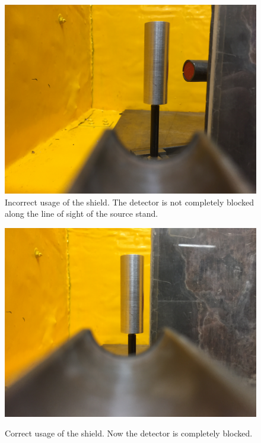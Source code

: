 \documentclass{../lab}
\begin{document}
\begin{enumerate}
\begin{figure}[H]
\begin{minipage}{.49\linewidth}
    \centering
    \href{http://experimentationlab.berkeley.edu/sites/default/files/upimages/Detector-Exposed.JPG}{\includegraphics[width=\linewidth,keepaspectratio]{images/Detector-Exposed.JPG}} \\
    \caption{Incorrect usage of the shield. The detector is not completely blocked along the line of sight of the source stand.}
    \label{fig:IncorrectShield}
\end{minipage}\hfill
\begin{minipage}{.49\linewidth}
    \centering
    \href{http://experimentationlab.berkeley.edu/sites/default/files/upimages/Detector-Shielded.JPG}{\includegraphics[width=\linewidth,keepaspectratio]{images/Detector-Shielded.JPG}} \\
    \caption{Correct usage of the shield. Now the detector is completely blocked.}
    \label{fig:CorrectShield}
\end{minipage} 
\end{figure}  


\end{enumerate}
\end{document}
